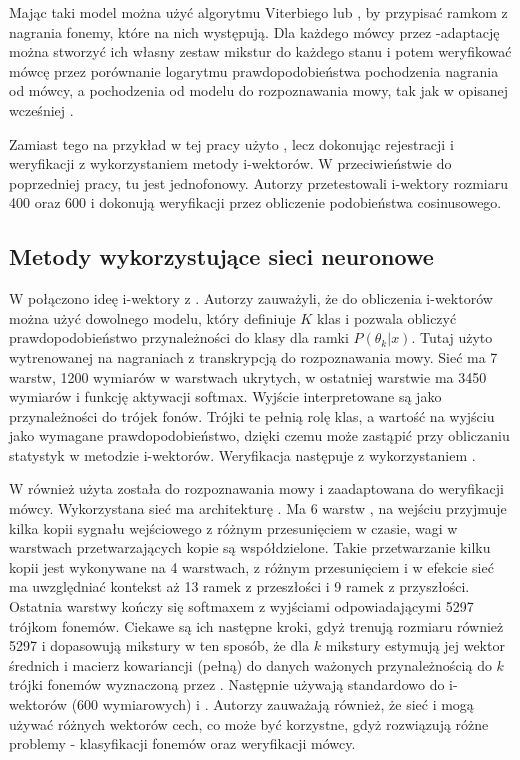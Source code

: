Mając taki model można użyć algorytmu Viterbiego lub , by przypisać ramkom z nagrania fonemy, które na nich występują. Dla każdego mówcy
przez -adaptację można stworzyć ich własny zestaw mikstur do każdego stanu i potem weryfikować mówcę przez porównanie logarytmu prawdopodobieństwa
pochodzenia nagrania od mówcy, a pochodzenia od modelu do rozpoznawania mowy, tak jak w opisanej wcześniej .

Zamiast tego na przykład w tej pracy \cite{iVectorHmmBased}
użyto , lecz dokonując rejestracji i weryfikacji z wykorzystaniem metody i-wektorów. W przeciwieństwie do poprzedniej pracy, tu  jest jednofonowy. Autorzy przetestowali
i-wektory rozmiaru 400 oraz 600 i dokonują weryfikacji przez obliczenie podobieństwa cosinusowego.

\subsection{Metody wykorzystujące sieci neuronowe}

W \cite{aNovelSchemeFor}
połączono ideę i-wektory z . Autorzy zauważyli, że do obliczenia i-wektorów można użyć dowolnego modelu, który definiuje $K$ klas i pozwala obliczyć prawdopodobieństwo
przynależności do klasy dla ramki $P(\theta_k | x)$.
Tutaj użyto  wytrenowanej na nagraniach z transkrypcją do rozpoznawania mowy. Sieć ma 7 warstw, 1200 wymiarów w warstwach ukrytych, w ostatniej warstwie ma 3450 wymiarów i funkcję aktywacji softmax.
Wyjście interpretowane są jako przynależności do trójek fonów. Trójki te pełnią rolę klas, a wartość na wyjściu jako wymagane prawdopodobieństwo, dzięki czemu  może zastąpić 
przy obliczaniu statystyk w metodzie i-wektorów. Weryfikacja następuje z wykorzystaniem .

W \cite{timeDelayDeep}
również użyta została  do rozpoznawania mowy i zaadaptowana do weryfikacji mówcy. Wykorzystana sieć ma architekturę . Ma 6 warstw ,
na wejściu przyjmuje kilka kopii sygnału wejściowego z różnym przesunięciem w czasie, wagi w warstwach przetwarzających kopie są współdzielone. Takie przetwarzanie kilku kopii jest wykonywane na
4 warstwach, z różnym przesunięciem i w efekcie sieć ma uwzględniać kontekst aż 13 ramek z przeszłości i 9 ramek z przyszłości. Ostatnia warstwy kończy się softmaxem z wyjściami odpowiadającymi 5297 trójkom fonemów.
Ciekawe są ich następne kroki, gdyż trenują  rozmiaru również 5297 i dopasowują mikstury w ten sposób, że dla $k$ mikstury estymują jej wektor średnich i macierz kowariancji (pełną)
do danych ważonych przynależnością do $k$ trójki fonemów wyznaczoną przez . Następnie używają  standardowo do i-wektorów (600 wymiarowych) i .
Autorzy zauważają również, że sieć i  mogą używać różnych wektorów cech, co może być korzystne, gdyż rozwiązują różne problemy - klasyfikacji fonemów oraz weryfikacji mówcy.

